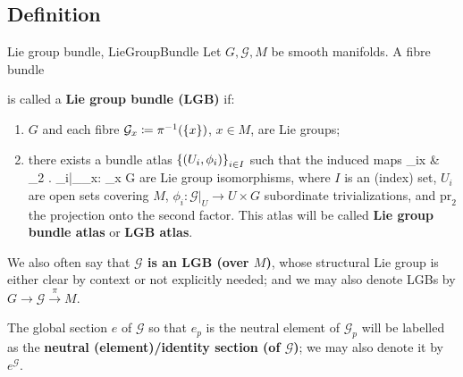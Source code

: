 \documentclass[a4paper,oneside,11pt,bibliography=totoc]{scrartcl}
\def\bas#1\eas{\begin{align*}#1\end{align*}}
\theoremstyle{plain}
\theoremstyle{remark}
\theoremstyle{definition}
\begin{document}
\subsection{Definition}
\begin{definitions}{Lie group bundle, \cite[\S 1.1, Def.\ 1.1.19; p. 11]{mackenzieGeneralTheory}}{LieGroupBundle}
Let $G, \mathcal{G}, M$ be smooth manifolds. A fibre bundle
\begin{center}
\end{center}
is called a \textbf{Lie group bundle (LGB)} if:
\begin{enumerate}
	\item $G$ and each fibre $\mathcal{G}_x \coloneqq \pi^{-1}\mleft( \{x\} \mright)$, $x\in M$, are Lie groups;
	\item there exists a bundle atlas $\mleft\{ \mleft( U_i, \phi_i \mright) \mright\}_{i \in I}$ such that the induced maps
	\bas
	\phi_{ix}
	&\coloneqq
	_2 \circ \mleft. \phi_i\mright|_{_x}: _x \to G
	\eas
	are Lie group isomorphisms, where $I$ is an (index) set, $U_i$ are open sets covering $M$, $\phi_i: \mathcal{G}|_U \to U \times G$ subordinate trivializations, and $\mathrm{pr}_2$ the projection onto the second factor. This atlas will be called \textbf{Lie group bundle atlas} or \textbf{LGB atlas}.
\end{enumerate}

We also often say that \textbf{$\mathcal{G}$ is an LGB (over $M$)}, whose structural Lie group is either clear by context or not explicitly needed; and we may also denote LGBs by $G \to \mathcal{G} \stackrel{\pi}{\to} M$.

The global section $e$ of $\mathcal{G}$ so that $e_p$ is the neutral element of $\mathcal{G}_p$ will be labelled as the \textbf{neutral (element)/identity section (of $\mathcal{G}$)}; we may also denote it by $e^{\mathcal{G}}$.
\end{definitions}
\end{document}
